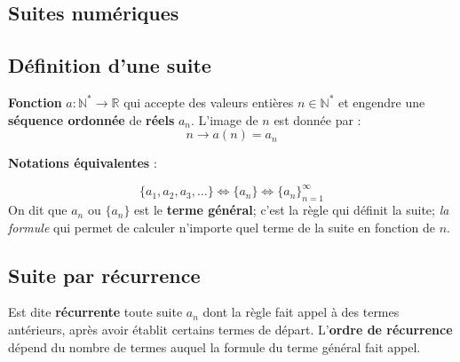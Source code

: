 \documentclass{report}
\begin{document}
\titleformat{\section}[block]{\normalsize\bfseries}{}{0pt}{}

\titleformat{\subsection}[block]{\small\bfseries}{}{0pt}{}


\begin{multicols*}{3}
    \footnotesize

    \chapter{Suites numériques}
    \section{Définition d'une suite}
        \textbf{Fonction} $a \colon \mathbb{N}^* 
        \rightarrow \mathbb{R}$ qui accepte des valeurs entières 
        $n \in \mathbb{N}^*$ et engendre une \textbf{séquence ordonnée} de 
        \textbf{réels} $a_n$. L'image de $n$ est donnée par :
        \[%
           n \rightarrow a(n) = a_n 
        \]%
        \begin{center}
        \textbf{Notations équivalentes} :    
        \end{center}
        \[%
            \{a_1, a_2, a_3,\dots\} \Leftrightarrow  \{ a_n \} 
                            \Leftrightarrow  \{a_n\}_{ n = 1}^{\infty }
        \]%
        On dit que $a_n$ ou $\{a_n\}$ est le \textbf{terme général}; c'est la 
        règle qui définit la suite; \textit{la formule}  qui permet de calculer 
        n'importe quel terme de la suite en fonction de $n$. 

    \vspace{-1em}
    \section{Suite par récurrence}
    Est dite \textbf{récurrente} toute suite $a_n$ dont la 
    règle fait appel à des termes antérieurs, après avoir 
    établit certains termes de départ. L'\textbf{ordre de récurrence}
    dépend du nombre de termes auquel la formule du terme général 
    fait appel.


\end{multicols*}
\end{document}
